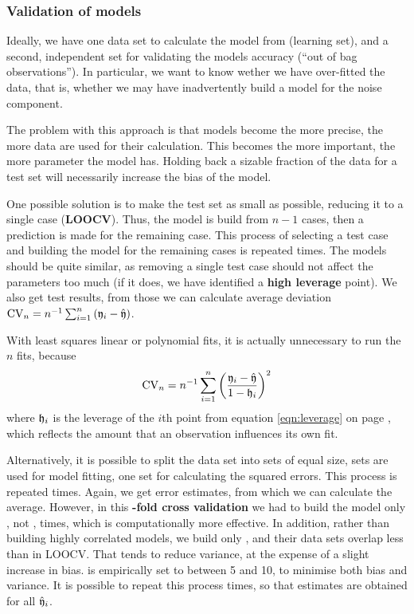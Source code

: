 \begin{refsection}
\subsubsection{Validation of models}\label{text:validation}

Ideally, we have one data set to calculate the model from (learning set), and a second, independent set for validating the models accuracy (``out of bag observations''). In particular, we want to know wether we have over-fitted the data, that is, whether we may have inadvertently build a model for the noise component.

The problem with this approach is that models become the more precise, the more data are used for their calculation. This becomes the more important, the more parameter the model has. Holding back a sizable fraction of the data for a test set will necessarily increase the bias of the model.

One possible solution is to make the test set as small as possible, reducing it to a single case (\textbf{\acf{LOOCV}}). Thus, the model is build from \( n-1 \) cases, then a prediction is made for the remaining case. This process of selecting a test case and building the model for the remaining cases is repeated  times. The  models should be quite similar, as removing a single test case should not affect the parameters too much (if it does, we have identified a \textbf{high leverage} point). We also get  test results, from those we can calculate average deviation \(\mathrm{CV}_n = n^{-1} \sum_{i=1}^n{(\mathfrak{y}_i-\hat{\mathfrak{y}})} \).

With least squares linear or polynomial fits, it is actually unnecessary to run the \(n \) fits, because
\begin{equation}
   \mathrm{CV}_n = n^{-1} \sum_{i=1}^n{\left(\frac{\mathfrak{y}_i-\hat{\mathfrak{y}}}{1-\mathfrak{h}_i}\right)^2}
\end{equation}
where \(\mathfrak{h}_i \) is the leverage of the \(i \)th point from equation \ref{eqn:leverage} on page \pageref{eqn:leverage}, which reflects the amount that an observation influences its own fit.

Alternatively, it is possible to split the data set into  sets of equal size,  sets are used for model fitting, one set for calculating the squared errors. This process is repeated  times. Again, we get  error estimates, from which we can calculate the average. However, in this \textbf{-fold cross validation} we had to build the model only , not , times, which is computationally more effective. In addition, rather than building  highly correlated models, we build only , and their data sets overlap less than in \acs{LOOCV}. That tends to reduce variance, at the expense of a slight increase in bias.  is empirically set to between 5 and 10, to minimise both bias and variance. It is possible to repeat this process  times, so that  estimates are obtained for all  \( \hat{\mathfrak{y}}_i \).



\end{refsection}
